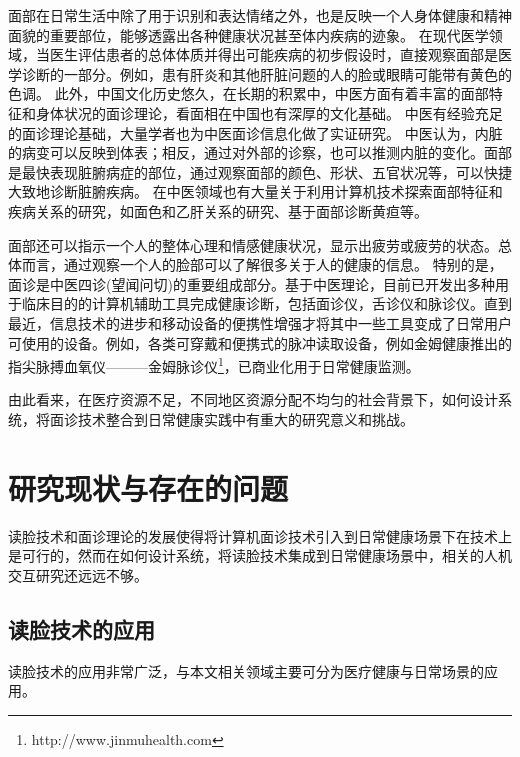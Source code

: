 面部在日常生活中除了用于识别和表达情绪之外，也是反映一个人身体健康和精神面貌的重要部位，能够透露出各种健康状况甚至体内疾病的迹象。
在现代医学领域，当医生评估患者的总体体质并得出可能疾病的初步假设时，直接观察面部是医学诊断的一部分\cite{Clifford2006Shortliffe}。例如，患有肝炎和其他肝脏问题的人的脸或眼睛可能带有黄色的色调\cite{Li2008Therapeutic}。
此外，中国文化历史悠久，在长期的积累中，中医方面有着丰富的面部特征和身体状况的面诊理论，看面相在中国也有深厚的文化基础。
中医有经验充足的面诊理论基础，大量学者也为中医面诊信息化做了实证研究。
中医认为，内脏的病变可以反映到体表；相反，通过对外部的诊察，也可以推测内脏的变化\cite{杨淑芳2002伤寒六经辨证初探}。面部是最快表现脏腑病症的部位，通过观察面部的颜色、形状、五官状况等，可以快捷大致地诊断脏腑疾病。
在中医领域也有大量关于利用计算机技术探索面部特征和疾病关系的研究，如面色和乙肝关系的研究\cite{杨宏志2007慢性乙型肝炎肝硬化中医面部五色诊断与临床病理的相关性研究}、基于面部诊断黄疸\cite{艾英1998黄疸病人面部色泽定量实验研究}等。

面部还可以指示一个人的整体心理和情感健康状况，显示出疲劳或疲劳的状态。总体而言，通过观察一个人的脸部可以了解很多关于人的健康的信息。
特别的是，面诊是中医四诊(望闻问切)的重要组成部分。基于中医理论，目前已开发出多种用于临床目的的计算机辅助工具完成健康诊断，包括面诊仪\cite{Liu2014Computerized}，舌诊仪\cite{Wang2004An}和脉诊仪\cite{Shu2007Developing}。直到最近，信息技术的进步和移动设备的便携性增强才将其中一些工具变成了日常用户可使用的设备。例如，各类可穿戴和便携式的脉冲读取设备，例如金姆健康推出的指尖脉搏血氧仪———金姆脉诊仪\footnote{http://www.jinmuhealth.com}，已商业化用于日常健康监测。

由此看来，在医疗资源不足，不同地区资源分配不均匀\cite{雷鹏中国医疗资源配置与服务利用现状评价}的社会背景下，如何设计系统，将面诊技术整合到日常健康实践中有重大的研究意义和挑战。

\section{研究现状与存在的问题}

读脸技术和面诊理论的发展使得将计算机面诊技术引入到日常健康场景下在技术上是可行的，然而在如何设计系统，将读脸技术集成到日常健康场景中，相关的人机交互研究还远远不够。

\subsection{读脸技术的应用}
读脸技术的应用非常广泛，与本文相关领域主要可分为医疗健康与日常场景的应用。

